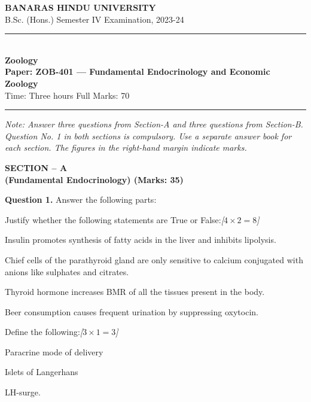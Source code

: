 \documentclass[11pt,a4paper]{article}
\newcommand{\pts}[1]{\hfill   \textit{[#1]}}
\begin{document}
\begin{center}
  {\large\bfseries BANARAS HINDU UNIVERSITY}\\[2pt]
  {\normalsize B.Sc. (Hons.) Semester IV Examination, 2023-24}\\[6pt]
  \rule{0.8\linewidth}{0.5pt}\\[6pt]
  {\large\bfseries Zoology}\\[4pt]
  {\large\bfseries Paper: ZOB-401 --- Fundamental Endocrinology and Economic Zoology}\\[4pt]
  {\normalsize Time: Three hours \hfill Full Marks: 70}
\end{center}

\rule{\linewidth}{0.4pt}

\smallskip



\noindent   \textit{Note: Answer three questions from Section-A and three questions from Section-B. Question No. 1 in both sections is compulsory. Use a separate answer book for each section. The figures in the right-hand margin indicate marks.}

\bigskip

\begin{center}
   \textbf{SECTION -- A} \\
   \textbf{(Fundamental Endocrinology) (Marks: 35)}
\end{center}

\medskip


\noindent   \textbf{Question 1.} Answer the following parts:

\begin{parts}
  \item Justify whether the following statements are True or False:\pts{$4  \times 2 = 8$}
  
\begin{parts}
    \item Insulin promotes synthesis of fatty acids in the liver and inhibits lipolysis.
    \item Chief cells of the parathyroid gland are only sensitive to calcium conjugated with anions like sulphates and citrates.
    \item Thyroid hormone increases BMR of all the tissues present in the body.
    \item Beer consumption causes frequent urination by suppressing oxytocin.
  \end{parts}
  
  \item Define the following:\pts{$3  \times 1 = 3$}
  
\begin{parts}
    \item Paracrine mode of delivery
    \item Islets of Langerhans
    \item LH-surge.
  \end{parts}
\end{parts}
\end{document}
